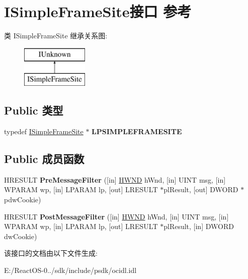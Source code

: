 \hypertarget{interface_i_simple_frame_site}{}\section{I\+Simple\+Frame\+Site接口 参考}
\label{interface_i_simple_frame_site}
类 I\+Simple\+Frame\+Site 继承关系图\+:\begin{figure}[H]
\begin{center}
\leavevmode
\includegraphics[height=2.000000cm]{interface_i_simple_frame_site}
\end{center}
\end{figure}
\subsection*{Public 类型}
\begin{DoxyCompactItemize}
\item 
\mbox{\label{interface_i_simple_frame_site_a2055ad60244515a04650b60e730b7555}} 
typedef \hyperlink{interface_i_simple_frame_site}{I\+Simple\+Frame\+Site} $\ast$ {\bfseries L\+P\+S\+I\+M\+P\+L\+E\+F\+R\+A\+M\+E\+S\+I\+TE}
\end{DoxyCompactItemize}
\subsection*{Public 成员函数}
\begin{DoxyCompactItemize}
\item 
\mbox{\label{interface_i_simple_frame_site_ad125c1b0ba5865d939480e25b950c866}} 
H\+R\+E\+S\+U\+LT {\bfseries Pre\+Message\+Filter} (\mbox{[}in\mbox{]} \hyperlink{interfacevoid}{H\+W\+ND} h\+Wnd, \mbox{[}in\mbox{]} U\+I\+NT msg, \mbox{[}in\mbox{]} W\+P\+A\+R\+AM wp, \mbox{[}in\mbox{]} L\+P\+A\+R\+AM lp, \mbox{[}out\mbox{]} L\+R\+E\+S\+U\+LT $\ast$pl\+Result, \mbox{[}out\mbox{]} D\+W\+O\+RD $\ast$pdw\+Cookie)
\item 
\mbox{\label{interface_i_simple_frame_site_a22c347c511df347b3c1f4dcc945ac567}} 
H\+R\+E\+S\+U\+LT {\bfseries Post\+Message\+Filter} (\mbox{[}in\mbox{]} \hyperlink{interfacevoid}{H\+W\+ND} h\+Wnd, \mbox{[}in\mbox{]} U\+I\+NT msg, \mbox{[}in\mbox{]} W\+P\+A\+R\+AM wp, \mbox{[}in\mbox{]} L\+P\+A\+R\+AM lp, \mbox{[}out\mbox{]} L\+R\+E\+S\+U\+LT $\ast$pl\+Result, \mbox{[}in\mbox{]} D\+W\+O\+RD dw\+Cookie)
\end{DoxyCompactItemize}


该接口的文档由以下文件生成\+:\begin{DoxyCompactItemize}
\item 
E\+:/\+React\+O\+S-\/0../sdk/include/psdk/ocidl.\+idl\end{DoxyCompactItemize}
